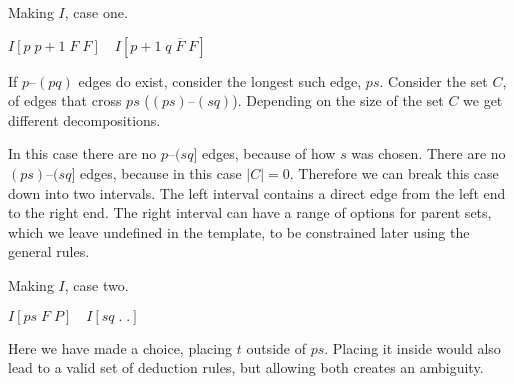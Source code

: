 \begin{finalEquation}
\caption{Making $I$, case one.}
  $I[p \; p{+}1 \; F \; F] \quad I[p{+}1 \; q \; \overline{F} \; F]$
\end{finalEquation}

If $p$--$(pq)$ edges do exist, consider the longest such edge, $ps$.
Consider the set $C$, of edges that cross $ps$ (\myie $(ps)$--$(sq)$).
Depending on the size of the set $C$ we get different decompositions.

\begin{center}
\end{center}

In this case there are no $p$--$(sq]$ edges, because of how $s$ was chosen.
There are no $(ps)$--$(sq]$ edges, because in this case $|C| = 0$.
Therefore we can break this case down into two intervals.
The left interval contains a direct edge from the left end to the right end.
The right interval can have a range of options for parent sets, which we leave undefined in the template, to be constrained later using the general rules.

\begin{finalEquation}
\caption{Making $I$, case two.}
  $I[ps \; F \; P] \quad I[sq \; . \; .]$
\end{finalEquation}

\begin{center}
\end{center}

Here we have made a choice, placing $t$ outside of $ps$.
Placing it inside would also lead to a valid set of deduction rules, but allowing both creates an ambiguity.

